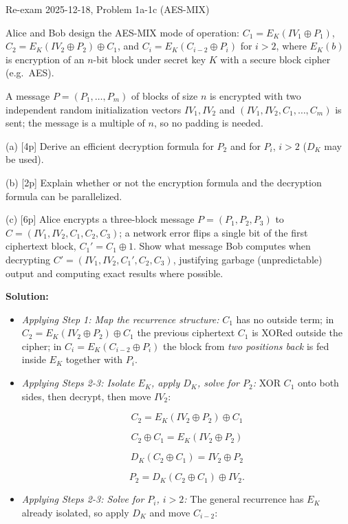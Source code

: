 \documentclass[12pt, a4paper]{article}
\begin{document}
\begin{practicebox}{Re-exam 2025-12-18, Problem 1a-1c (AES-MIX)}
\begin{problembox}
Alice and Bob design the AES-MIX mode of operation: $C_1 = E_K(IV_1 \oplus P_1)$, $C_2 = E_K(IV_2 \oplus P_2) \oplus C_1$, and $C_i = E_K(C_{i-2} \oplus P_i)$ for $i > 2$, where $E_K(b)$ is encryption of an $n$-bit block under secret key $K$ with a secure block cipher (e.g.\ AES).

A message $P = (P_1, \dots, P_m)$ of blocks of size $n$ is encrypted with two independent random initialization vectors $IV_1, IV_2$ and $(IV_1, IV_2, C_1, \dots, C_m)$ is sent; the message is a multiple of $n$, so no padding is needed.

(a) [4p] Derive an efficient decryption formula for $P_2$ and for $P_i$, $i > 2$ ($D_K$ may be used).

(b) [2p] Explain whether or not the encryption formula and the decryption formula can be parallelized.

(c) [6p] Alice encrypts a three-block message $P = (P_1, P_2, P_3)$ to $C = (IV_1, IV_2, C_1, C_2, C_3)$; a network error flips a single bit of the first ciphertext block, $C_1' = C_1 \oplus 1$.
Show what message Bob computes when decrypting $C' = (IV_1, IV_2, C_1', C_2, C_3)$, justifying garbage (unpredictable) output and computing exact results where possible.
\end{problembox}

\textbf{Solution:}
\begin{itemize}
    \item \textit{Applying Step 1: Map the recurrence structure:} $C_1$ has no outside term; in $C_2 = E_K(IV_2 \oplus P_2) \oplus C_1$ the previous ciphertext $C_1$ is XORed outside the cipher; in $C_i = E_K(C_{i-2} \oplus P_i)$ the block from \emph{two positions back} is fed inside $E_K$ together with $P_i$.
    \item \textit{Applying Steps 2-3: Isolate $E_K$, apply $D_K$, solve for $P_2$:} XOR $C_1$ onto both sides, then decrypt, then move $IV_2$:

\[
C_2 = E_K(IV_2 \oplus P_2) \oplus C_1
\]

\[
C_2 \oplus C_1 = E_K(IV_2 \oplus P_2)
\]

\[
D_K(C_2 \oplus C_1) = IV_2 \oplus P_2
\]

\[
P_2 = D_K(C_2 \oplus C_1) \oplus IV_2.
\]

    \item \textit{Applying Steps 2-3: Solve for $P_i$, $i > 2$:} The general recurrence has $E_K$ already isolated, so apply $D_K$ and move $C_{i-2}$:


\end{itemize}
\end{practicebox}
\end{document}
